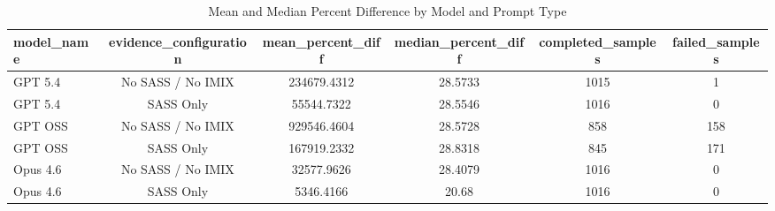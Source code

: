 \begin{table}[htbp]
\centering
\caption{Mean and Median Percent Difference by Model and Prompt Type}
\label{tab:model\_percent\_diff\_summary}
\begin{tabular}{lccccc}
\toprule
model\_name & evidence\_configuration & mean\_percent\_diff & median\_percent\_diff & completed\_samples & failed\_samples \\
\midrule
GPT 5.4 & No SASS / No IMIX & 234679.4312 & 28.5733 & 1015 & 1 \\
GPT 5.4 & SASS Only & 55544.7322 & 28.5546 & 1016 & 0 \\
GPT OSS & No SASS / No IMIX & 929546.4604 & 28.5728 & 858 & 158 \\
GPT OSS & SASS Only & 167919.2332 & 28.8318 & 845 & 171 \\
Opus 4.6 & No SASS / No IMIX & 32577.9626 & 28.4079 & 1016 & 0 \\
Opus 4.6 & SASS Only & 5346.4166 & 20.68 & 1016 & 0 \\
\bottomrule
\end{tabular}
\end{table}
